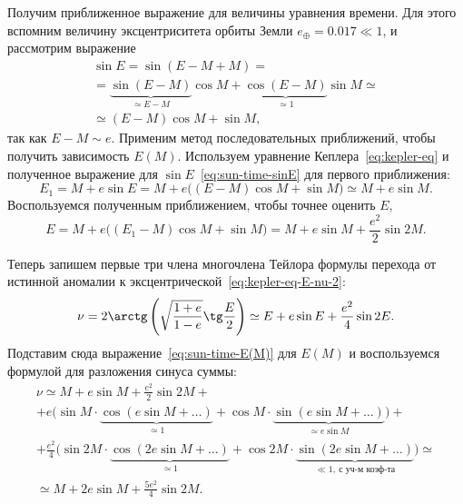 Получим приближенное выражение для величины уравнения времени. Для этого вспомним величину эксцентриситета орбиты Земли $e_\oplus = 0.017 \ll 1$, и рассмотрим выражение
\begin{multline}
    \sin E
        = \sin(E - M + M) =\\
        = \underbrace{\sin (E - M)}_{\simeq E - M} \cos M + \underbrace{\cos(E - M)}_{\simeq 1} \sin M \simeq\\
        \simeq (E - M) \cos M + \sin M,
        \label{eq:sun-time-sinE}
\end{multline}
так как $E - M \sim e$. Применим метод последовательных приближений, чтобы получить зависимость $E(M)$. Используем уравнение Кеплера~\eqref{eq:kepler-eq} и полученное выражение для $\sin E$~\eqref{eq:sun-time-sinE} для первого приближения: 
\begin{equation*}
    E_1
        = M + e \sin E
        = M + e \big( (E - M) \cos M + \sin M \big)
        \simeq M + e \sin M.
\end{equation*}
Воспользуемся полученным приближением, чтобы точнее оценить $E$,
\begin{equation}
    E
        = M + e \big( (E_1 - M) \cos M + \sin M \big)
        = M + e \sin M + \frac{e^2}{2} \sin 2M.
    \label{eq:sun-time-E(M)}
\end{equation}

Теперь запишем первые три члена многочлена Тейлора формулы перехода от истинной аномалии к эксцентрической~\eqref{eq:kepler-eq-E-nu-2}:
\begin{equation*}
    \nu
        = 2 \arctg \left(\sqrt{\frac{1+e}{1-e}} \tg \frac{E}{2} \right)
        \simeq E + e \sin E + \frac{e^2}{4} \sin 2E.
\end{equation*}
Подставим сюда выражение~\eqref{eq:sun-time-E(M)} для $E(M)$ и воспользуемся формулой для разложения синуса суммы:
\begin{multline*}
    \nu
        \simeq M + e \sin M + \frac{e^2}{2} \sin 2M + \\
        + e \bigg( 
            \sin M \cdot \underbrace{\cos (e \sin M + \ldots)}_{\simeq 1} + 
            \cos M \cdot \underbrace{\sin ( e \sin M  + \ldots )}_{\simeq e \sin M} 
        \bigg) + \\
        + \frac{e^2}{4} \bigg( 
            \sin 2M \cdot \underbrace{\cos (2e \sin M + \ldots)}_{\simeq 1} + 
            \cos 2M \cdot \underbrace{\sin (2e \sin M + \ldots)}_{\ll 1,~\text{с уч-м коэф-та}}
        \bigg)  \simeq \\
        \simeq M + 2e \sin M + \frac{5e^2}{4} \sin 2M.
\end{multline*}

